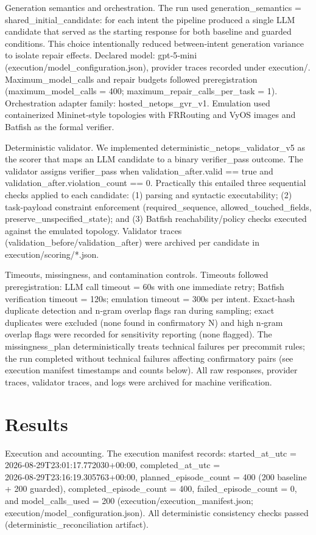 \documentclass[conference]{IEEEtran}
\begin{document}
Generation semantics and orchestration. The run used generation\_semantics = shared\_initial\_candidate: for each intent the pipeline produced a single LLM candidate that served as the starting response for both baseline and guarded conditions. This choice intentionally reduced between‑intent generation variance to isolate repair effects. Declared model: gpt‑5‑mini (execution/model\_configuration.json), provider traces recorded under execution/. Maximum\_model\_calls and repair budgets followed preregistration (maximum\_model\_calls = 400; maximum\_repair\_calls\_per\_task = 1). Orchestration adapter family: hosted\_netops\_gvr\_v1. Emulation used containerized Mininet‑style topologies with FRRouting and VyOS images and Batfish as the formal verifier.

Deterministic validator. We implemented deterministic\_netops\_validator\_v5 as the scorer that maps an LLM candidate to a binary verifier\_pass outcome. The validator assigns verifier\_pass when validation\_after.valid == true and validation\_after.violation\_count == 0. Practically this entailed three sequential checks applied to each candidate: (1) parsing and syntactic executability; (2) task‑payload constraint enforcement (required\_sequence, allowed\_touched\_fields, preserve\_unspecified\_state); and (3) Batfish reachability/policy checks executed against the emulated topology. Validator traces (validation\_before/validation\_after) were archived per candidate in execution/scoring/*.json.

Timeouts, missingness, and contamination controls. Timeouts followed preregistration: LLM call timeout = 60s with one immediate retry; Batfish verification timeout = 120s; emulation timeout = 300s per intent. Exact‑hash duplicate detection and n‑gram overlap flags ran during sampling; exact duplicates were excluded (none found in confirmatory N) and high n‑gram overlap flags were recorded for sensitivity reporting (none flagged). The missingness\_plan deterministically treats technical failures per precommit rules; the run completed without technical failures affecting confirmatory pairs (see execution manifest timestamps and counts below). All raw responses, provider traces, validator traces, and logs were archived for machine verification.

\section{Results}
Execution and accounting. The execution manifest records: started\_at\_utc = 2026‑08‑29T23:01:17.772030+00:00, completed\_at\_utc = 2026‑08‑29T23:16:19.305763+00:00, planned\_episode\_count = 400 (200 baseline + 200 guarded), completed\_episode\_count = 400, failed\_episode\_count = 0, and model\_calls\_used = 200 (execution/execution\_manifest.json; execution/model\_configuration.json). All deterministic consistency checks passed (deterministic\_reconciliation artifact).
\end{document}
